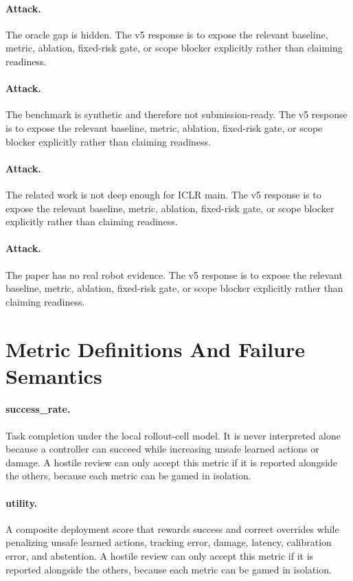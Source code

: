 \documentclass{article}
\begin{document}
\paragraph{Attack.} The oracle gap is hidden. The v5 response is to expose the relevant baseline, metric, ablation, fixed-risk gate, or scope blocker explicitly rather than claiming readiness.
\paragraph{Attack.} The benchmark is synthetic and therefore not submission-ready. The v5 response is to expose the relevant baseline, metric, ablation, fixed-risk gate, or scope blocker explicitly rather than claiming readiness.
\paragraph{Attack.} The related work is not deep enough for ICLR main. The v5 response is to expose the relevant baseline, metric, ablation, fixed-risk gate, or scope blocker explicitly rather than claiming readiness.
\paragraph{Attack.} The paper has no real robot evidence. The v5 response is to expose the relevant baseline, metric, ablation, fixed-risk gate, or scope blocker explicitly rather than claiming readiness.
\clearpage
\section{Metric Definitions And Failure Semantics}
\paragraph{success\_rate.} Task completion under the local rollout-cell model. It is never interpreted alone because a controller can succeed while increasing unsafe learned actions or damage. A hostile review can only accept this metric if it is reported alongside the others, because each metric can be gamed in isolation.
\paragraph{utility.} A composite deployment score that rewards success and correct overrides while penalizing unsafe learned actions, tracking error, damage, latency, calibration error, and abstention. A hostile review can only accept this metric if it is reported alongside the others, because each metric can be gamed in isolation.
\end{document}
